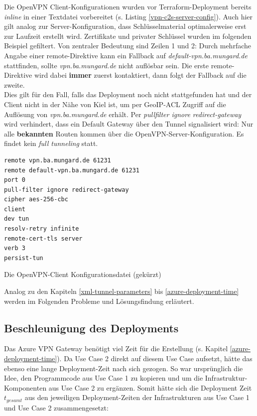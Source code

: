 Die OpenVPN \gls{Client}-Konfigurationen wurden vor Terraform-\gls{Deployment} bereits \textit{inline} in einer Textdatei vorbereitet (s. Listing \ref{vpn-c2s-server-config}). Auch hier gilt analog zur Server-Konfiguration, dass Schlüsselmaterial optimalerweise erst zur Laufzeit erstellt wird. Zertifikate und privater Schlüssel wurden im folgenden Beispiel gefiltert. Von zentraler Bedeutung sind Zeilen 1 und 2: Durch mehrfache Angabe einer remote-Direktive kann ein \gls{Fallback} auf \textit{default-vpn.ba.mungard.de} stattfinden, sollte \textit{vpn.ba.mungard.de} nicht auflösbar sein. Die erste remote-Direktive wird dabei \textbf{immer} zuerst kontaktiert, dann folgt der \gls{Fallback} auf die zweite.\\
Dies gilt für den Fall, falls das \gls{Deployment} noch nicht stattgefunden hat und der \gls{Client} nicht in der Nähe von Kiel ist, um per \gls{GeoIP}-\gls{ACL} Zugriff auf die Auflösung von \textit{vpn.ba.mun\-gard\-.de} erhält. Per \textit{pullfilter ignore redirect-gateway} wird verhindert, dass ein Default Gateway über den Tunnel signalisiert wird: Nur alle \textbf{bekannten} Routen kommen über die OpenVPN-Server-Konfiguration. Es findet kein \textit{full tunneling} statt.
\begin{listing}[h]
\begin{verbatim}
remote vpn.ba.mungard.de 61231
remote default-vpn.ba.mungard.de 61231
port 0
pull-filter ignore redirect-gateway
cipher aes-256-cbc
client
dev tun
resolv-retry infinite
remote-cert-tls server
verb 3
persist-tun

\end{verbatim}
\caption{Die OpenVPN-Client Konfigurationsdatei (gekürzt)}
\label{ovpn-client-conf}
\end{listing}\FloatBarrier



\newpage
Analog zu den Kapiteln \ref{xml-tunnel-parameters} bis \ref{azure-deployment-time} werden im Folgenden Probleme und Lösungsfindung erläutert.
\subsection{Beschleunigung des Deployments}\label{accelerate-deployment-use-case-2}
Das Azure \gls{VPN} Gateway benötigt viel Zeit für die Erstellung (s. Kapitel \ref{azure-deployment-time}). Da Use Case 2 direkt auf diesem Use Case aufsetzt, hätte das ebenso eine lange \gls{Deployment}-Zeit nach sich gezogen. So war ursprünglich die Idee, den Programmcode aus Use Case 1 zu kopieren und um die Infrastruktur-Komponenten aus Use Case 2 zu ergänzen. Somit hätte sich die \gls{Deployment} Zeit $t_{gesamt}$ aus den jeweiligen \gls{Deployment}-Zeiten der Infrastrukturen aus Use Case 1 und Use Case 2 zusammengesetzt:\\

